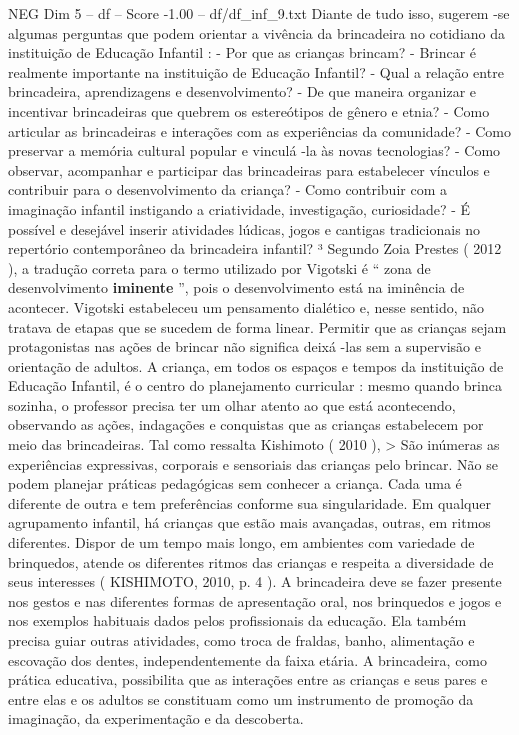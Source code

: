 \begin{textsample}{NEG Dim 5 – df – Score -1.00 – df/df\_inf\_9.txt}
Diante de tudo isso, sugerem -se algumas perguntas que podem orientar a vivência da brincadeira no cotidiano da instituição de Educação Infantil : - Por que as crianças brincam? - Brincar é realmente importante na instituição de Educação Infantil? - Qual a relação entre brincadeira, aprendizagens e desenvolvimento? - De que maneira organizar e incentivar brincadeiras que quebrem os estereótipos de gênero e etnia? - Como articular as brincadeiras e interações com as experiências da comunidade? - Como preservar a memória cultural popular e vinculá -la às novas tecnologias? - Como observar, acompanhar e participar das brincadeiras para estabelecer vínculos e contribuir para o desenvolvimento da criança? - Como contribuir com a imaginação infantil instigando a criatividade, investigação, curiosidade? - É possível e desejável inserir atividades lúdicas, jogos e cantigas tradicionais no repertório contemporâneo da brincadeira infantil? ³ Segundo Zoia Prestes ( 2012 ), a tradução correta para o termo utilizado por Vigotski é “ zona de desenvolvimento \textbf{iminente} ”, pois o desenvolvimento está na iminência de acontecer.
Vigotski estabeleceu um pensamento dialético e, nesse sentido, não tratava de etapas que se sucedem de forma linear.
Permitir que as crianças sejam protagonistas nas ações de brincar não significa deixá -las sem a supervisão e orientação de adultos.
A criança, em todos os espaços e tempos da instituição de Educação Infantil, é o centro do planejamento curricular : mesmo quando brinca sozinha, o professor precisa ter um olhar atento ao que está acontecendo, observando as ações, indagações e conquistas que as crianças estabelecem por meio das brincadeiras.
Tal como ressalta Kishimoto ( 2010 ), > São inúmeras as experiências expressivas, corporais e sensoriais das crianças pelo brincar.
Não se podem planejar práticas pedagógicas sem conhecer a criança.
Cada uma é diferente de outra e tem preferências conforme sua singularidade.
Em qualquer agrupamento infantil, há crianças que estão mais avançadas, outras, em ritmos diferentes.
Dispor de um tempo mais longo, em ambientes com variedade de brinquedos, atende os diferentes ritmos das crianças e respeita a diversidade de seus interesses ( KISHIMOTO, 2010, p. 4 ).
A brincadeira deve se fazer presente nos gestos e nas diferentes formas de apresentação oral, nos brinquedos e jogos e nos exemplos habituais dados pelos profissionais da educação.
Ela também precisa guiar outras atividades, como troca de fraldas, banho, alimentação e escovação dos dentes, independentemente da faixa etária.
A brincadeira, como prática educativa, possibilita que as interações entre as crianças e seus pares e entre elas e os adultos se constituam como um instrumento de promoção da imaginação, da experimentação e da descoberta.

\end{textsample}
